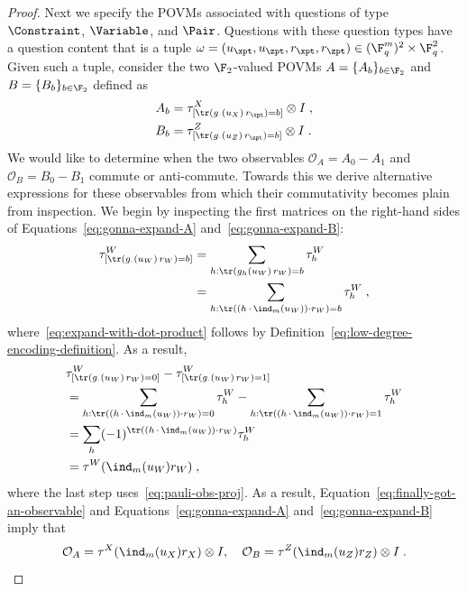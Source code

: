 \begin{proof}
  Next we specify the POVMs associated with questions of type $\Constraint$,
  $\Variable$, and $\Pair$.
  Questions with these question types have a question content that is a tuple
  $\omega= (u_\xpt, u_\zpt, r_\xpt, r_\zpt)\in (\F_q^m)^2 \times \F_q^2$.
  Given such a tuple, consider the two $\F_2$-valued POVMs $A=\{A_b\}_{b \in
    \F_2}$ and $B=\{B_b\}_{b \in \F_2}$ defined as
  \begin{align}
    A_b & = \tau^X_{[\tr(g_{\cdot}(u_X)\, r_\xpt) = b]} \otimes I\;,\label{eq:gonna-expand-A}\\
    B_b & = \tau^Z_{[\tr(g_{\cdot}(u_Z)\, r_\zpt) = b]} \otimes I\;.\label{eq:gonna-expand-B}
  \end{align}
  We would like to determine when the two observables $\mathcal{O}_A = A_0 -
  A_1$ and $\mathcal{O}_B = B_0 - B_1$ commute or anti-commute.
  Towards this we derive alternative expressions for these observables from
  which their commutativity becomes plain from inspection.
  We begin by inspecting the first matrices on the right-hand sides of
  Equations~\eqref{eq:gonna-expand-A} and~\eqref{eq:gonna-expand-B}:
  \begin{align}
  \tau^W_{[\tr(g_{\cdot}(u_W)\, r_W) = b]}
  &= \sum_{h : \tr(g_{h}(u_W)\, r_W) = b} \tau^W_h\nonumber\\
  &= \sum_{h : \tr((h\, \cdot\, \ind_{m}(u_W)) \cdot r_W ) = b} \tau^W_h\;,\label{eq:expand-with-dot-product}
  \end{align}
  where~\eqref{eq:expand-with-dot-product}
  follows by  Definition~\ref{eq:low-degree-encoding-definition}.
  As a result,
  \begin{align}
&  \tau^W_{[\tr(g_{\cdot}(u_W)\, r_W) = 0]}
  -   \tau^W_{[\tr(g_{\cdot}(u_W)\, r_W) = 1]} \notag \\
  & = \sum_{h : \tr((h\, \cdot\, \ind_{m}(u_W)) \cdot r_W ) = 0} \tau^W_h
  	- \sum_{h : \tr((h\, \cdot\, \ind_{m}(u_W)) \cdot r_W ) = 1} \tau^W_h\nonumber\\
  & = \sum_{h} (-1)^{\tr((h\, \cdot\, \ind_{m}(u_W)) \cdot r_W )} \tau^W_h\nonumber\\
  & = \tau^W(\ind_{m}(u_W)r_W)\;,\label{eq:finally-got-an-observable}
  \end{align}
  where the last step uses~\eqref{eq:pauli-obs-proj}.
  As a result, Equation~\eqref{eq:finally-got-an-observable}
  and Equations~\eqref{eq:gonna-expand-A} and~\eqref{eq:gonna-expand-B} imply that
  \begin{equation*}
  \mathcal{O}_A = \tau^X(\ind_{m}(u_X)r_X) \otimes I,\quad
  \mathcal{O}_B = \tau^Z(\ind_{m}(u_Z)r_Z) \otimes I\;.

\end{equation*}
\end{proof}
